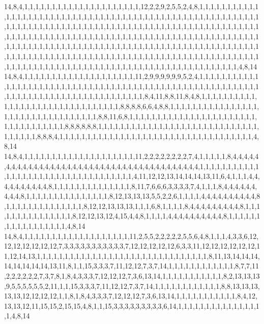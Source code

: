 14,8,4,1,1,1,1,1,1,1,1,1,1,1,1,1,1,1,1,1,1,1,1,1,12,2,2,9,2,5,5,2,4,8,1,1,1,1,1,1,1,1,1,1,1,1,1,1,1,1,1,1,1,1,1,1,1,1,1,1,1,1,1,1,1,1,1,1,1,1,1,1,1,1,1,1,1,1,1,1,1,1,1,1,1,1,1,1,1,1,1,1,1,1,1,1,1,1,1,1,1,1,1,1,1,1,1,1,1,1,1,1,1,1,1,1,1,1,1,1,1,1,1,1,1,1,1,1,1,1,1,1,1,1,1,1,1,1,1,1,1,1,1,1,1,1,1,1,1,1,1,1,1,1,1,1,1,1,1,1,1,1,1,1,1,1,1,1,1,1,1,1,1,1,1,1,1,1,1,1,1,1,1,1,1,1,1,1,1,1,1,1,1,1,1,1,1,1,1,1,1,1,1,1,1,1,1,1,1,1,1,1,1,1,1,1,1,1,1,1,1,1,1,1,1,1,1,1,1,1,1,1,1,1,1,1,1,1,1,1,1,1,1,1,1,1,1,1,1,1,1,1,1,1,1,1,1,1,1,1,1,1,1,1,1,1,1,1,1,1,1,1,1,1,1,1,1,1,1,1,1,1,1,1,1,1,1,1,1,1,1,1,1,1,1,1,1,1,1,1,1,1,1,1,1,1,1,1,1,1,1,1,1,1,1,1,1,4,8,14
14,8,4,1,1,1,1,1,1,1,1,1,1,1,1,1,1,1,1,1,1,1,1,11,2,9,9,9,9,9,9,5,2,4,1,1,1,1,1,1,1,1,1,1,1,1,1,1,1,1,1,1,1,1,1,1,1,1,1,1,1,1,1,1,1,1,1,1,1,1,1,1,1,1,1,1,1,1,1,1,1,1,1,1,1,1,1,1,1,1,1,1,1,1,1,1,1,1,1,1,1,1,1,1,1,1,1,1,1,1,1,1,1,1,1,1,8,4,11,8,8,11,8,4,8,1,1,1,1,1,1,1,1,1,1,1,1,1,1,1,1,1,1,1,1,1,1,1,1,1,1,1,1,1,1,1,8,8,8,8,6,6,4,8,8,1,1,1,1,1,1,1,1,1,1,1,1,1,1,1,1,1,1,1,1,1,1,1,1,1,1,1,1,1,1,1,1,1,8,8,11,6,8,1,1,1,1,1,1,1,1,1,1,1,1,1,1,1,1,1,1,1,1,1,1,1,1,1,1,1,1,1,1,1,1,1,1,8,8,8,8,8,8,1,1,1,1,1,1,1,1,1,1,1,1,1,1,1,1,1,1,1,1,1,1,1,1,1,1,1,1,1,1,1,1,1,1,1,8,8,8,4,1,1,1,1,1,1,1,1,1,1,1,1,1,1,1,1,1,1,1,1,1,1,1,1,1,1,1,1,1,1,1,1,1,1,1,4,8,14
14,8,4,1,1,1,1,1,1,1,1,1,1,1,1,1,1,1,1,1,1,1,1,11,2,2,2,2,2,2,2,2,7,4,1,1,1,1,1,8,4,4,4,4,4,4,4,4,4,4,4,4,4,4,4,4,4,4,4,4,4,4,4,4,4,4,4,4,4,4,4,4,4,4,4,4,4,4,4,4,1,1,1,1,1,1,1,1,1,1,1,1,1,1,1,1,1,1,1,1,1,1,1,1,1,1,1,1,1,1,1,1,1,1,4,11,12,12,13,14,14,14,13,11,6,4,1,1,1,4,4,4,4,4,4,4,4,4,4,8,1,1,1,1,1,1,1,1,1,1,1,1,1,1,8,11,7,6,6,6,3,3,3,3,7,4,1,1,1,8,4,4,4,4,4,4,4,4,4,8,1,1,1,1,1,1,1,1,1,1,1,1,1,1,1,8,12,13,13,13,5,5,2,2,6,1,1,1,1,4,4,4,4,4,4,4,4,4,4,8,1,1,1,1,1,1,1,1,1,1,1,1,1,1,8,12,12,13,13,13,1,1,1,6,8,1,1,1,1,8,4,4,4,4,4,4,4,4,4,8,1,1,1,1,1,1,1,1,1,1,1,1,1,1,1,8,12,12,13,12,4,15,4,4,8,1,1,1,1,4,4,4,4,4,4,4,4,4,4,8,1,1,1,1,1,1,1,1,1,1,1,1,1,1,1,1,1,4,8,14
14,8,4,1,1,1,1,1,1,1,1,1,1,1,1,1,1,1,1,1,1,1,11,2,5,5,2,2,2,2,2,5,5,6,4,8,1,1,1,4,3,3,6,12,12,12,12,12,12,12,7,3,3,3,3,3,3,3,3,3,3,3,7,12,12,12,12,12,6,3,3,11,12,12,12,12,12,12,11,12,14,13,1,1,1,1,1,1,1,1,1,1,1,1,1,1,1,1,1,1,1,1,1,1,1,1,1,1,1,1,1,1,1,8,11,13,14,14,14,14,14,14,14,14,13,11,8,1,1,15,3,3,3,7,11,12,12,7,3,7,14,1,1,1,1,1,1,1,1,1,1,1,1,8,7,7,11,2,2,2,2,2,2,7,3,7,8,1,8,4,3,3,3,7,12,12,12,7,3,6,13,14,1,1,1,1,1,1,1,1,1,1,1,8,2,13,13,13,9,5,5,5,5,5,5,2,11,1,1,15,3,3,3,7,11,12,12,7,3,7,14,1,1,1,1,1,1,1,1,1,1,1,1,8,8,13,13,13,13,13,12,12,12,12,1,1,8,1,8,4,3,3,3,7,12,12,12,7,3,6,13,14,1,1,1,1,1,1,1,1,1,1,1,8,4,12,13,13,12,11,15,15,2,15,15,4,8,1,1,15,3,3,3,3,3,3,3,3,3,6,14,1,1,1,1,1,1,1,1,1,1,1,1,1,1,1,1,4,8,14
